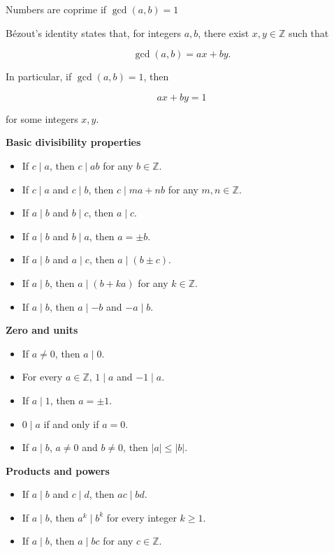 \begin{mistake}
  Numbers are coprime if \(\operatorname{gcd}(a,b) = 1\)
\end{mistake}

\begin{mistake}
  Bézout's identity states that, for integers \(a, b\), there exist \(x, y \in \mathbb{Z}\) such that

\[
\operatorname{gcd}(a, b)=a x+b y .
\]

In particular, if \(\operatorname{gcd}(a, b)=1\), then

\[
a x+b y=1
\]

for some integers \(x, y\).
\end{mistake}

\begin{mistake}
\textbf{Basic divisibility properties}
\begin{itemize}
    \item If $c\mid a$, then $c\mid ab$ for any $b\in\mathbb Z$.
    \item If $c\mid a$ and $c\mid b$, then
    $c\mid ma+nb$ for any $m,n\in\mathbb Z$.
    \item If $a\mid b$ and $b\mid c$, then $a\mid c$.
    \item If $a\mid b$ and $b\mid a$, then $a=\pm b$.
    \item If $a\mid b$ and $a\mid c$, then $a\mid(b\pm c)$.
    \item If $a\mid b$, then $a\mid(b+ka)$ for any $k\in\mathbb Z$.
    \item If $a\mid b$, then $a\mid -b$ and $-a\mid b$.
\end{itemize}

\textbf{Zero and units}
\begin{itemize}
    \item If $a\neq0$, then $a\mid0$.
    \item For every $a\in\mathbb Z$, $1\mid a$ and $-1\mid a$.
    \item If $a\mid1$, then $a=\pm1$.
    \item $0\mid a$ if and only if $a=0$.
    \item If $a\mid b$, $a\neq0$ and $b\neq0$, then $|a|\leq|b|$.
\end{itemize}

\textbf{Products and powers}
\begin{itemize}
    \item If $a\mid b$ and $c\mid d$, then $ac\mid bd$.
    \item If $a\mid b$, then $a^k\mid b^k$ for every integer $k\geq1$.
    \item If $a\mid b$, then $a\mid bc$ for any $c\in\mathbb Z$.
\end{itemize}


\end{mistake}
